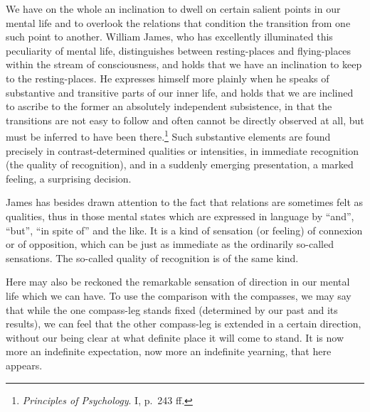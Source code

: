 \documentclass[12pt]{article}
\newcommand{\opage}[1]{\marginnote{\footnotesize\textit{[#1]}}}
\begin{document}
We have on the whole an inclination to dwell on certain salient points in
our mental life and to overlook the relations that condition the transition
from one such point to another. William James, who has excellently
illuminated this peculiarity of mental life, distinguishes between
resting-places and flying-places within the stream of consciousness, and
\opage{22}holds that we have an inclination to keep to the resting-places. He
expresses himself more plainly when he speaks of substantive and transitive
parts of our inner life, and holds that we are inclined to ascribe to the
former an absolutely independent subsistence, in that the transitions are
not easy to follow and often cannot be directly observed at all, but must be
inferred to have been there.\footnote{\textit{Principles of Psychology}. I,
  p.~243 ff.} Such substantive elements are found precisely in
contrast-determined qualities or intensities, in immediate recognition (the
quality of recognition), and in a suddenly emerging presentation, a marked
feeling, a surprising decision.

James has besides drawn attention to the fact that relations are sometimes
felt as qualities, thus in those mental states which are expressed in
language by ``and'', ``but'', ``in spite of'' and the like. It is a kind of
sensation (or feeling) of connexion or of opposition, which can be just as
immediate as the ordinarily so-called sensations. The so-called quality of
recognition is of the same kind.

Here may also be reckoned the remarkable sensation of direction in our
mental life which we can have. To use the comparison with the compasses, we
may say that while the one compass-leg stands fixed (determined by our past
and its results), we can feel that the other compass-leg is extended in a
certain direction, without our being clear at what definite place it will
come to stand. It is now more an indefinite expectation, now more an
indefinite yearning, that here appears.
\end{document}
